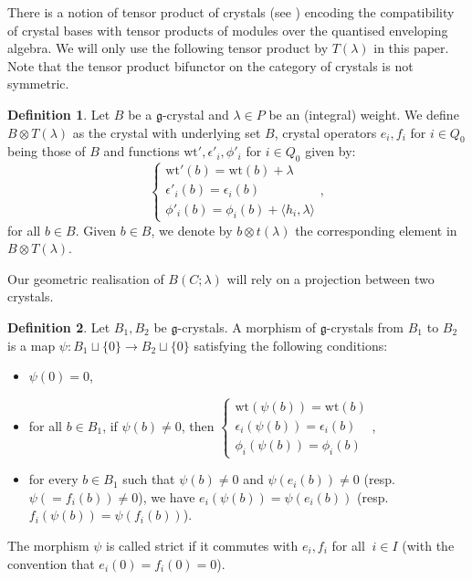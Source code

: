 \documentclass[a4paper,12pt]{article}
\theoremstyle{definition}
\newtheorem{definition}{Definition}[section]
\theoremstyle{plain}
\theoremstyle{remark}
\begin{document}
There is a notion of tensor product of crystals (see \cite[\S 7.3]{Kas95}) encoding the compatibility of crystal bases with tensor products of modules over the quantised enveloping algebra. We will only use the following tensor product by $T(\lambda)$ in this paper. Note that the tensor product bifunctor on the category of crystals is not symmetric.

\begin{definition}
Let $B$ be a $\mathfrak{g}$-crystal and $\lambda\in P$ be an (integral) weight. We define $B\otimes T(\lambda)$ as the crystal with underlying set $B$, crystal operators $e_i,f_i$ for $ i\in Q_0$ being those of $B$ and functions $\mathrm{wt}',\epsilon'_i,\phi'_i$ for $ i\in Q_0$ given by:
\[
\left\{
\begin{array}{l}
\mathrm{wt'}(b)=\mathrm{wt}(b)+\lambda \\
\epsilon'_i(b)=\epsilon_i(b) \\
\phi'_i(b)=\phi_i(b)+\langle h_i,\lambda\rangle
\end{array}
\right.
,
\]
for all $b\in B$. Given $b\in B$, we denote by $b\otimes t(\lambda)$ the corresponding element in $B\otimes T(\lambda)$.
\end{definition}

Our geometric realisation of $B(C;\lambda)$ will rely on a projection between two crystals.

\begin{definition}
Let $B_1,B_2$ be $\mathfrak{g}$-crystals. A morphism of $\mathfrak{g}$-crystals from $B_1$ to $B_2$ is a map $\psi \colon B_1\sqcup\{0\}\rightarrow B_2\sqcup\{0\}$ satisfying the following conditions:
\begin{itemize}
\item $\psi(0)=0$,
\item for all $b\in B_1$, if $\psi(b)\ne0$, then $
\left\{
\begin{array}{l}
\mathrm{wt}(\psi(b))=\mathrm{wt}(b) \\
\epsilon_i(\psi(b))=\epsilon_i(b) \\
\phi_i(\psi(b))=\phi_i(b)
\end{array}
\right.
$,
\item for every $b\in B_1$ such that $\psi(b)\ne0$ and $\psi(e_i(b))\ne0$ (resp.\ $\psi(=f_i(b))\ne0$), we have $e_i(\psi(b))=\psi(e_i(b))$ (resp.\ $f_i(\psi(b))=\psi(f_i(b))$).
\end{itemize}
The morphism $\psi$ is called strict if it commutes with $e_i,f_i$ for all $\ i\in I$ (with the convention that $e_i(0)=f_i(0)=0$).
\end{definition}
\end{document}
